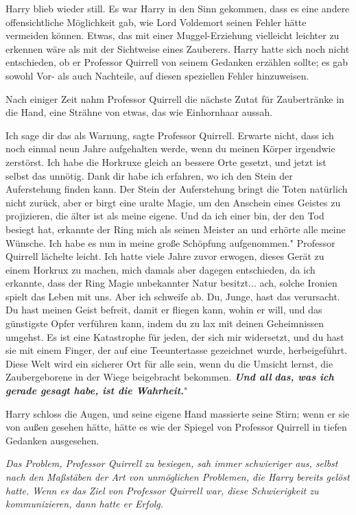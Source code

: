 Harry blieb wieder still. Es war Harry in den Sinn gekommen, dass es eine andere
offensichtliche Möglichkeit gab, wie Lord Voldemort seinen Fehler hätte
vermeiden können. Etwas, das mit einer Muggel-Erziehung vielleicht leichter zu
erkennen wäre als mit der Sichtweise eines Zauberers. Harry hatte sich noch
nicht entschieden, ob er Professor Quirrell von seinem Gedanken erzählen sollte;
es gab sowohl Vor- als auch Nachteile, auf diesen speziellen Fehler hinzuweisen.

Nach einiger Zeit nahm Professor Quirrell die nächste Zutat für Zaubertränke in
die Hand, eine Strähne von etwas, das wie Einhornhaar aussah.

\glqq{}Ich sage dir das als Warnung\grqq{}, sagte Professor Quirrell. \glqq
Erwarte nicht, dass ich noch einmal neun Jahre aufgehalten werde, wenn du meinen
Körper irgendwie zerstörst. Ich habe die Horkruxe gleich an bessere Orte
gesetzt, und jetzt ist selbst das unnötig. Dank dir habe ich erfahren, wo ich
den Stein der Auferstehung finden kann. Der Stein der Auferstehung bringt die
Toten natürlich nicht zurück, aber er birgt eine uralte Magie, um den Anschein
eines Geistes zu projizieren, die älter ist als meine eigene. Und da ich einer
bin, der den Tod besiegt hat, erkannte der Ring mich als seinen Meister an und
erhörte alle meine Wünsche. Ich habe es nun in meine große Schöpfung
aufgenommen." Professor Quirrell lächelte leicht. \glqq{}Ich hatte viele Jahre
zuvor erwogen, dieses Gerät zu einem Horkrux zu machen, mich damals aber dagegen
entschieden, da ich erkannte, dass der Ring Magie unbekannter Natur besitzt...
ach, solche Ironien spielt das Leben mit uns. Aber ich schweife ab. Du, Junge,
hast das verursacht. Du hast meinen Geist befreit, damit er fliegen kann, wohin
er will, und das günstigste Opfer verführen kann, indem du zu lax mit deinen
Geheimnissen umgehst. Es ist eine Katastrophe für jeden, der sich mir
widersetzt, und du hast sie mit einem Finger, der auf eine Teeuntertasse
gezeichnet wurde, herbeigeführt. Diese Welt wird ein sicherer Ort für alle sein,
wenn du die Umsicht lernst, die Zaubergeborene in der Wiege beigebracht
bekommen. \textbf{\emph{Und all} }\textbf{\emph{das, was ich gerade gesagt habe,
ist die Wahrheit.}}"

Harry schloss die Augen, und seine eigene Hand massierte seine Stirn; wenn er
sie von außen gesehen hätte, hätte es wie der Spiegel von Professor Quirrell in
tiefen Gedanken ausgesehen.

\emph{Das Problem, Professor Quirrell zu besiegen, sah immer schwieriger aus,
selbst nach den Maßstäben der Art von unmöglichen Problemen, die Harry bereits
gelöst hatte. Wenn es das Ziel von Professor Quirrell war, diese Schwierigkeit
zu kommunizieren, dann hatte er Erfolg.}

